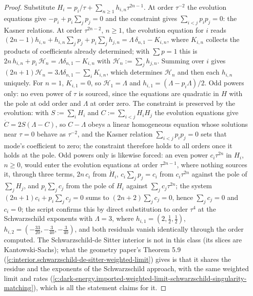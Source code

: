 \documentclass[11pt]{article}
\theoremstyle{definition}
\theoremstyle{plain}
\begin{document}
\begin{proof}
Substitute $H_i = p_i/\tau + \sum_{n\geq 1}h_{i,n}\tau^{2n-1}$. At order $\tau^{-2}$ the evolution equations give $-p_i + p_i\sum_j p_j = 0$ and the constraint gives $\sum_{i<j}p_ip_j = 0$: the Kasner relations. At order $\tau^{2n-2}$, $n \geq 1$, the evolution equation for $i$ reads $(2n-1)h_{i,n} + h_{i,n}\sum_j p_j + p_i\sum_j h_{j,n} = \Lambda\,\delta_{n,1} - K_{i,n}$, where $K_{i,n}$ collects the products of coefficients already determined; with $\sum p = 1$ this is $2n\,h_{i,n} + p_i\,\mathcal{H}_n = \Lambda\delta_{n,1} - K_{i,n}$ with $\mathcal{H}_n := \sum_j h_{j,n}$. Summing over $i$ gives $(2n+1)\mathcal{H}_n = 3\Lambda\delta_{n,1} - \sum_iK_{i,n}$, which determines $\mathcal{H}_n$ and then each $h_{i,n}$ uniquely. For $n = 1$, $K_{i,1} = 0$, so $\mathcal{H}_1 = \Lambda$ and $h_{i,1} = (\Lambda - p_i\Lambda)/2$. Odd powers only: no even power of $\tau$ is sourced, since the equations are quadratic in $H$ with the pole at odd order and $\Lambda$ at order zero. The constraint is preserved by the evolution: with $S := \sum_iH_i$ and $C := \sum_{i<j}H_iH_j$ the evolution equations give $\dot C = 2S(\Lambda - C)$, so $C - \Lambda$ obeys a linear homogeneous equation whose solutions near $\tau = 0$ behave as $\tau^{-2}$, and the Kasner relation $\sum_{i<j}p_ip_j = 0$ sets that mode's coefficient to zero; the constraint therefore holds to all orders once it holds at the pole. Odd powers only is likewise forced: an even power $c_i\tau^{2n}$ in $H_i$, $n \geq 0$, would enter the evolution equations at order $\tau^{2n-1}$, where nothing sources it, through three terms, $2n\,c_i$ from $\dot H_i$, $c_i\sum_jp_j = c_i$ from $c_i\tau^{2n}$ against the pole of $\sum_jH_j$, and $p_i\sum_jc_j$ from the pole of $H_i$ against $\sum_jc_j\tau^{2n}$; the system $(2n+1)c_i + p_i\sum_jc_j = 0$ sums to $(2n+2)\sum_jc_j = 0$, hence $\sum_jc_j = 0$ and $c_i = 0$; the script confirms this by direct substitution to order $\tau^4$ at the Schwarzschild exponents with $\Lambda = 3$, where $h_{i,1} = (2, \tfrac12, \tfrac12)$, $h_{i,2} = (-\tfrac{33}{20}, -\tfrac{3}{40}, -\tfrac{3}{40})$, and both residuals vanish identically through the order computed. The Schwarzschild-de Sitter interior is not in this class (its slices are Kantowski-Sachs); what the geometry paper's Theorem 5.9 \cite[Thm.~5.9]{ButlerT6} (\ref{c:interior.schwarzschild-de-sitter-weighted-limit}) gives is that it shares the residue and the exponents of the Schwarzschild approach, with the same weighted limit and rates (\ref{c:dark-energy.imported-weighted-limit-schwarzschild-singularity-matching}), which is all the statement claims for it.

\end{proof}
\end{document}
